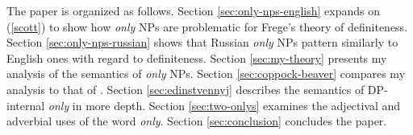 
The paper is organized as follows. Section \ref{sec:only-nps-english} expands on (\ref{scott}) to show how \textit{only} NPs are problematic for Frege's theory of definiteness. Section \ref{sec:only-nps-russian} shows that Russian \textit{only} NPs pattern similarly to English ones with regard to definiteness. Section \ref{sec:my-theory} presents my analysis of the semantics of \textit{only} NPs. Section \ref{sec:coppock-beaver} compares my analysis to that of \citet{cb2015}. Section \ref{sec:edinstvennyj} describes the semantics of DP-internal \textit{only} in more depth. Section \ref{sec:two-onlys} examines the adjectival and adverbial uses of the word \textit{only}. Section \ref{sec:conclusion} concludes the paper.